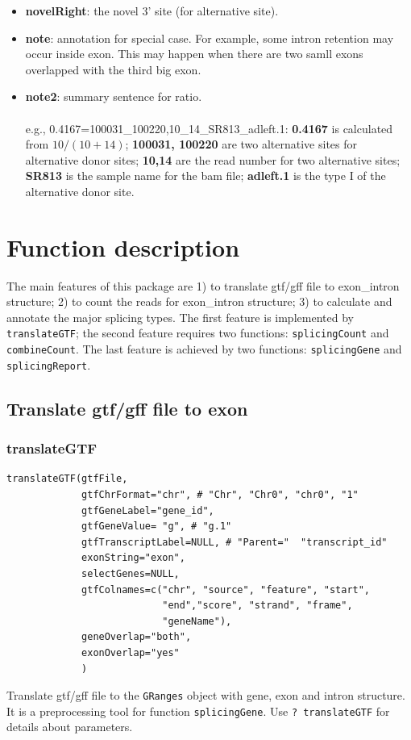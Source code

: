 \documentclass[a4paper]{article}
\begin{document}
\begin{itemize}
\item \textbf{novelRight}: the novel 3' site (for alternative site).  
\item \textbf{note}: annotation for special case. For example, some intron retention may occur inside exon.
This may happen when there are two samll exons overlapped with the third big exon.
\item \textbf{note2}: summary sentence for ratio.
\\ \\
e.g., 0.4167=100031\_100220,10\_14\_SR813\_adleft.1: \textbf{0.4167} is calculated from $10/(10+14)$; \textbf{100031, 100220} are two alternative sites for alternative donor sites; \textbf{10,14} are the read number for two alternative sites; \textbf{SR813} is the sample name for the bam file; \textbf{adleft.1} is the type I of the alternative donor site. 
\end{itemize}

\section{Function description} 
The main features of this package are 1) to translate gtf/gff file to exon\_intron structure; 2) to count the reads for exon\_intron structure; 3) to calculate and annotate the major splicing types. The first feature is implemented by \texttt{translateGTF}; the second feature requires two functions: \texttt{splicingCount} and \texttt{combineCount}. The last feature is achieved by two functions: \texttt{splicingGene} and \texttt{splicingReport}.
\subsection{Translate gtf/gff file to exon}
\subsubsection{translateGTF}
\begin{verbatim}
translateGTF(gtfFile,   
             gtfChrFormat="chr", # "Chr", "Chr0", "chr0", "1" 
             gtfGeneLabel="gene_id",
             gtfGeneValue= "g", # "g.1"
             gtfTranscriptLabel=NULL, # "Parent="  "transcript_id"                          
             exonString="exon",
             selectGenes=NULL,
             gtfColnames=c("chr", "source", "feature", "start", 
                           "end","score", "strand", "frame", 
                           "geneName"),
             geneOverlap="both", 
             exonOverlap="yes"
             )

\end{verbatim}
Translate gtf/gff file to the \texttt{GRanges}  object with gene, exon and intron structure.
It is a preprocessing tool for function \texttt{splicingGene}.
\newline  \newline
Use \texttt{? translateGTF} for details about parameters. \newline
\end{document}
